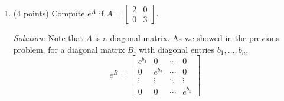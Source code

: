 \documentclass{article}
\begin{document}
\begin{enumerate}
        Substituting these values of $A^m$ into the matrix exponential series,
        we obtain the following expression for $e^A$:
        \[
          e^A =
          \begin{bmatrix}
            \displaystyle\sum_{m=0}^{\infty}\frac{a_1^m}{m!}
                   & 0                                                & \cdots & 0      \\
            0      & \displaystyle\sum_{m=0}^{\infty}\frac{a_2^m}{m!}
                   & \cdots                                           & 0               \\
            \vdots & \vdots                                           & \ddots & \vdots \\
            0      & 0                                                & \cdots &
            \displaystyle\sum_{m=0}^{\infty}\frac{a_n^m}{m!}
          \end{bmatrix}.
        \]

        The Maclaurin series provides an expression for $e^x$, which gives us the following for each diagonal entry.
        \[
          \sum_{m=0}^{\infty}\frac{a_i^m}{m!}=e^{a_i}.
        \]

        Hence,
        \[
          \boxed{
            e^A =
            \begin{bmatrix}
              e^{a_1} & 0       & \cdots & 0       \\
              0       & e^{a_2} & \cdots & 0       \\
              \vdots  & \vdots  & \ddots & \vdots  \\
              0       & 0       & \cdots & e^{a_n}
            \end{bmatrix}
          }.
        \]
  \item (4 points) Compute $e^A$ if $A = \begin{bmatrix} 2 & 0 \\ 0 & 3 \end{bmatrix}$.

        \emph{Solution}: Note that $A$ is a diagonal matrix. As we showed in the previous problem, for a diagonal matrix $B$, with diagonal entries $b_1,\dots,b_n$,
        \[
          e^B =
          \begin{bmatrix}
            e^{b_1} & 0       & \cdots & 0       \\
            0       & e^{b_2} & \cdots & 0       \\
            \vdots  & \vdots  & \ddots & \vdots  \\
            0       & 0       & \cdots & e^{b_n}
          \end{bmatrix}
        \]


\end{enumerate}
\end{document}
